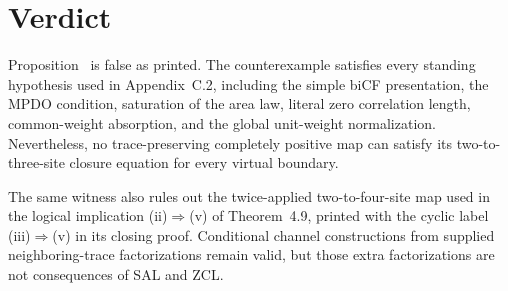 \documentclass{article}
\begin{document}
\section{Verdict}

Proposition~ is false as printed. The counterexample
satisfies every standing hypothesis used in Appendix~C.2, including the
simple biCF presentation, the MPDO condition, saturation of the area law,
literal zero correlation length, common-weight absorption, and the global
unit-weight normalization. Nevertheless, no trace-preserving completely
positive map can satisfy its two-to-three-site closure equation for every
virtual boundary.

The same witness also rules out the twice-applied two-to-four-site map used in
the logical implication (ii)$\Rightarrow$(v) of Theorem~4.9, printed with the
cyclic label (iii)$\Rightarrow$(v) in its closing proof. Conditional
channel constructions from supplied neighboring-trace factorizations remain
valid, but those extra factorizations are not consequences of SAL and ZCL.



\end{document}

